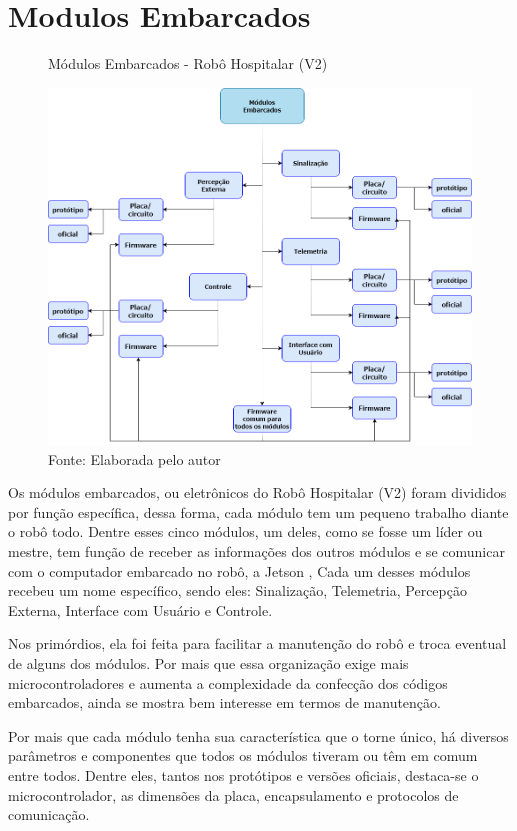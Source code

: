 \documentclass[../delivery_hospital_report.tex]{subfiles}
\begin{document}
\chapter{Modulos Embarcados}

\begin{figure}[h]
\centering
    \caption{Módulos Embarcados - Robô Hospitalar (V2)}
    \centering %
    \includegraphics[width=15cm]{modulos_embarcados.png}
    \caption*{Fonte: Elaborada pelo autor}
    \label{figura:1° Versão Robô Hospitalar}
\end{figure}

 Os módulos embarcados, ou eletrônicos do Robô Hospitalar (V2) foram divididos por função específica, dessa forma, cada módulo tem um pequeno trabalho diante o robô todo. Dentre esses cinco módulos, um deles, como se fosse um líder ou mestre, tem função de receber as informações dos outros módulos e se comunicar com o computador embarcado no robô, a Jetson \cite{jetson21}, Cada um desses módulos recebeu um nome específico, sendo eles: Sinalização, Telemetria, Percepção Externa, Interface com Usuário e Controle.

Nos primórdios, ela foi feita para facilitar a manutenção do robô e troca eventual de alguns dos módulos. Por mais que essa organização exige mais microcontroladores e aumenta a complexidade da confecção dos códigos embarcados, ainda se mostra bem interesse em termos de manutenção.

Por mais que cada módulo tenha sua característica que o torne único, há diversos parâmetros e componentes que todos os módulos tiveram ou têm em comum entre todos.  Dentre eles, tantos nos protótipos e versões oficiais, destaca-se o microcontrolador, as dimensões da placa, encapsulamento e protocolos de comunicação.
\end{document}
